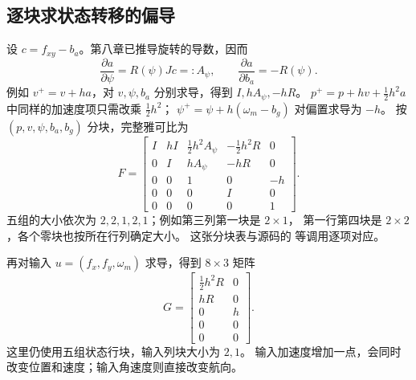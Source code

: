 \subsection{逐块求状态转移的偏导}
设 $c=f_{xy}-b_a$。第八章已推导旋转的导数，因而
\begin{equation}
\frac{\partial a}{\partial\psi}=R(\psi)Jc=:A_\psi,
\qquad \frac{\partial a}{\partial b_a}=-R(\psi).
\end{equation}
例如 $v^+=v+ha$，对 $v,\psi,b_a$ 分别求导，得到 $I,hA_\psi,-hR$。
$p^+=p+hv+\tfrac12h^2a$ 中同样的加速度项只需改乘 $\tfrac12h^2$；
$\psi^+=\psi+h(\omega_m-b_g)$ 对偏置求导为 $-h$。
按 $(p,v,\psi,b_a,b_g)$ 分块，完整雅可比为
\begin{equation}
F=\begin{bmatrix}
 I&hI&\tfrac12h^2A_\psi&-\tfrac12h^2R&0\\
 0&I&hA_\psi&-hR&0\\
 0&0&1&0&-h\\
 0&0&0&I&0\\
 0&0&0&0&1
\end{bmatrix}.
\end{equation}
五组的大小依次为 $2,2,1,2,1$；例如第三列第一块是 $2\times1$，
第一行第四块是 $2\times2$，各个零块也按所在行列确定大小。
这张分块表与源码的  等调用逐项对应。

再对输入 $u=(f_x,f_y,\omega_m)$ 求导，得到 $8\times3$ 矩阵
\begin{equation}
G=\begin{bmatrix}
\tfrac12h^2R&0\\ hR&0\\ 0&h\\0&0\\0&0
\end{bmatrix}.
\end{equation}
这里仍使用五组状态行块，输入列块大小为 $2,1$。
输入加速度增加一点，会同时改变位置和速度；输入角速度则直接改变航向。

\par\noindent\begin{minipage}{\linewidth}

\end{minipage}\par

